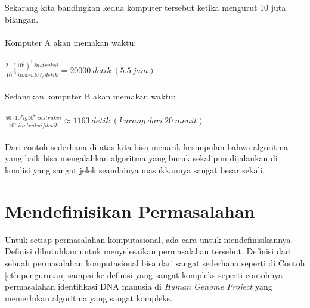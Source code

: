 Sekarang kita bandingkan kedua komputer tersebut ketika mengurut 10 juta bilangan. 
\hspace*{\fill}\\\hspace*{\fill}\\
Komputer A akan memakan waktu:
\hspace*{\fill}\\\hspace*{\fill}\\
$\frac{2\cdot(10^7)^2\ instruksi}{10^{10}\ instruksi/detik} = 20000\ detik\ (5.5\ jam)$
\hspace*{\fill}\\\hspace*{\fill}\\
Sedangkan komputer B akan memakan waktu:
\hspace*{\fill}\\\hspace*{\fill}\\
$\frac{50\cdot10^7lg10^7\ instruksi}{10^{7}\ instruksi/detik} \approx 1163\ detik\ (kurang\ dari\ 20\ menit)$
\hspace*{\fill}\\\hspace*{\fill}\\

Dari contoh sederhana di atas kita bisa menarik kesimpulan bahwa algoritma yang baik bisa mengalahkan algoritma yang buruk sekalipun dijalankan di kondisi yang sangat jelek seandainya masukkannya sangat besar sekali. 

\section{Mendefinisikan Permasalahan}
Untuk setiap permasalahan komputasional, ada cara untuk mendefinisikannya. Definisi dibutuhkan untuk menyelesaikan permasalahan tersebut. Definisi dari sebuah permasalahan komputasional bisa dari sangat sederhana seperti di Contoh \ref{cth:pengurutan} sampai ke definisi yang sangat kompleks seperti contohnya permasalahan identifikasi DNA manusia di \textit{Human Genome Project} yang memerlukan algoritma yang sangat kompleks.

